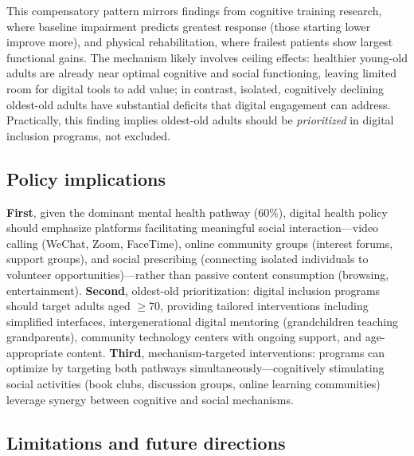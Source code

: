 \documentclass[10pt]{article}
\begin{document}
This compensatory pattern mirrors findings from cognitive training research, where baseline impairment predicts greatest response (those starting lower improve more), and physical rehabilitation, where frailest patients show largest functional gains. The mechanism likely involves ceiling effects: healthier young-old adults are already near optimal cognitive and social functioning, leaving limited room for digital tools to add value; in contrast, isolated, cognitively declining oldest-old adults have substantial deficits that digital engagement can address. Practically, this finding implies oldest-old adults should be \textit{prioritized} in digital inclusion programs, not excluded.

\subsection*{Policy implications}

\textbf{First}, given the dominant mental health pathway (60\%), digital health policy should emphasize platforms facilitating meaningful social interaction---video calling (WeChat, Zoom, FaceTime), online community groups (interest forums, support groups), and social prescribing (connecting isolated individuals to volunteer opportunities)---rather than passive content consumption (browsing, entertainment). \textbf{Second}, oldest-old prioritization: digital inclusion programs should target adults aged $\geq$70, providing tailored interventions including simplified interfaces, intergenerational digital mentoring (grandchildren teaching grandparents), community technology centers with ongoing support, and age-appropriate content. \textbf{Third}, mechanism-targeted interventions: programs can optimize by targeting both pathways simultaneously---cognitively stimulating social activities (book clubs, discussion groups, online learning communities) leverage synergy between cognitive and social mechanisms.

\subsection*{Limitations and future directions}
\end{document}
